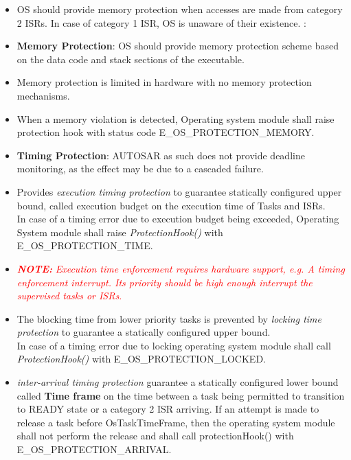 \begin{itemize}
	\item OS should provide memory protection when accesses are made from category 2 ISRs. In case of category 1 ISR, OS is unaware of their existence.
: 	\item \textbf{Memory Protection}: OS should provide memory protection scheme based on the data code and stack sections of the executable.
	\item Memory protection is limited in hardware with no memory protection mechanisms.
	\item When a memory violation is detected, Operating system module shall raise protection hook with status code E\_OS\_PROTECTION\_MEMORY.
	\item \textbf{Timing Protection}: AUTOSAR as such does not provide deadline monitoring, as the effect may be due to a cascaded failure.
	\item Provides \textit{execution timing protection }to guarantee statically configured upper bound, called execution budget on the execution time of Tasks and ISRs. \\ In case of a timing error due to execution budget being exceeded, Operating System module shall raise \textit{ProtectionHook()} with E\_OS\_PROTECTION\_TIME.
	\item \textcolor{red}{\textbf{\textit{NOTE:}} \textit{Execution time enforcement requires hardware support, e.g. A timing enforcement interrupt. Its priority should be high enough interrupt the supervised tasks or ISRs}.}
	\item The blocking time from lower priority tasks is prevented by \textit{locking time protection} to guarantee a statically configured upper bound.\\ In case of a timing error due to locking operating system module shall call \textit{ProtectionHook()} with E\_OS\_PROTECTION\_LOCKED.
	\item \textit{inter-arrival timing protection} guarantee a statically configured lower bound called \textbf{Time frame} on the time between a task being permitted to transition to READY state or a category 2 ISR arriving. If an attempt is made to release a task before OsTaskTimeFrame, then the operating system module shall not perform the release and shall call protectionHook() with E\_OS\_PROTECTION\_ARRIVAL.
\end{itemize}
